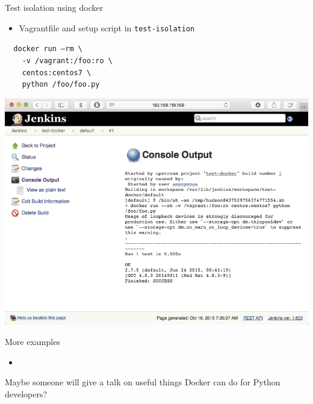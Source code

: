 \documentclass[xcolor=svgnames,17pt]{beamer}
\begin{document}
\begin{frame}{Test isolation using docker}
\begin{itemize}
\item Vagrantfile and setup script in \texttt{test-isolation}
\end{itemize}
\pause
\texttt{\ \ docker run --rm \textbackslash} \\
\pause
\texttt{\ \ \ \ -v /vagrant:/foo:ro \textbackslash} \\
\pause
\texttt{\ \ \ \ centos:centos7 \textbackslash} \\
\pause
\texttt{\ \ \ \ python /foo/foo.py} \\
\pause
\end{frame}

\begin{frame}[plain]{}
\includegraphics[width=\paperwidth,frame,center]{docker-output.png}
\end{frame}

\begin{frame}{More examples}
\begin{itemize}
\item \href{https://stripe.com/blog/distributed-ruby-testing}{%
    }
\end{itemize}
\pause
Maybe someone will give a talk on useful things Docker can do for Python
developers?
\end{frame}
\end{document}
